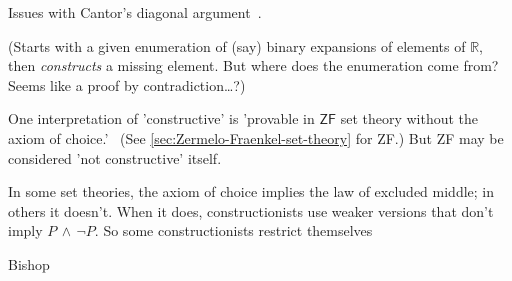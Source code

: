 \label{sec:Cardinality_of_R}

Issues with Cantor's diagonal 
argument~\cite{wiki:Cantors_diagonal_argument}.

(Starts with a given enumeration of (say) binary expansions of 
elements of $\mathbb{R}$, then \textit{constructs} a missing
element. But where does the enumeration come from?
Seems like a proof by contradiction\ldots?)

\label{sec:Axiom_of_choice}

One interpretation of 'constructive' is
'provable in $\textsf{ZF}$ set theory without the axiom of 
choice.'~\cite{iep:Set_theory,wiki:Axiom_of_choice}
(See \autoref{sec:Zermelo-Fraenkel-set-theory} for \textsf{ZF}.)
But \textsf{ZF} may be considered 'not constructive'
itself.

In some set theories, the axiom of choice implies
the law of excluded middle; in others it doesn't.
When it does, constructionists use weaker versions
that don't imply $P \, \wedge \, \lnot P$.
So some constructionists restrict themselves

\label{sec:Measure_theory}

Bishop~\cite{bishop1967foundations,bishop1972constructive,bishop1985constructive}

 